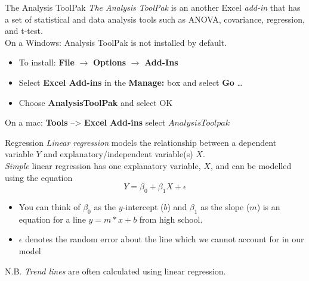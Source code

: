 \documentclass[xcolor=svgnames, handout]{beamer}
\newcommand{\red}[1]{\textcolor{red}{#1}}
\newcommand{\ra}{$\rightarrow$ }
\begin{document}
\begin{frame}{The Analysis ToolPak}
\emph{The Analysis ToolPak} is an another Excel \emph{add-in} that has a set of statistical and data analysis tools such as ANOVA, covariance, regression, and t-test.\\[1em]

On a Windows: Analysis ToolPak is not installed by default.
\begin{itemize}
\item To install: {\bf File} $\rightarrow$ {\bf Options} \ra {\bf Add-Ins} 
\item Select {\bf Excel Add-ins} in the {\bf Manage:} box and select {\bf Go} \dots
\item Choose {\bf AnalysisToolPak} and select OK\\[2em]
\end{itemize}


On a mac: {\bf Tools} -->  {\bf Excel Add-ins} select $Analysis Toolpak$\\[2em]

\end{frame}



%
%
%


\begin{frame}[label=current]{Regression}
\emph{Linear regression} models the relationship between a dependent variable $Y$ and explanatory/independent variable(s) $X$. \\[1em]	
\textit{Simple} linear regression has one explanatory variable, $X$, and can be modelled using the equation
\begin{equation}
Y = \beta_0 +  \beta_1 X +  \epsilon
\end{equation}
\begin{itemize}
\item You can think of $\beta_0$  as the $y$-intercept ($b$) and  $\beta_1$ as the slope ($m$) is an equation for a line $y = m*x + b$ from high school.
\medskip
\item $\epsilon$ denotes the random error about the line which we cannot account for in our model
\end{itemize}
N.B. \emph{Trend lines} are often calculated using linear regression.
\end{frame}
\end{document}
